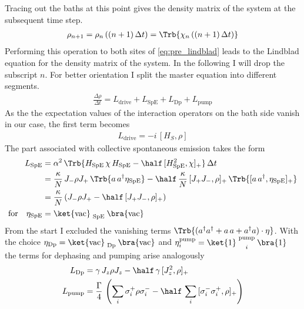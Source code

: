 Tracing out the baths at this point gives the density matrix of the system at the subsequent time step. 
\begin{align*}
    \rho_{n+1}=\rho_n\left((n+1)\,\Delta t\right)=\Trb{\chi_n\left((n+1)\,\Delta t\right)}
\end{align*}
Performing this operation to both sites of \eqref{eq:pre_lindblad} leads to the Lindblad equation for the density matrix of the system. In the following I will drop the subscript $n$. For better orientation I split the master equation into different segments.
\begin{align*}
    \frac{\Delta\rho}{\Delta t}=L_\text{drive}+L_\text{SpE}+L_\text{Dp}+L_\text{pump}
\end{align*}
As the the expectation values of the interaction operators on the bath side vanish in our case, the first term becomes
\begin{align*}
    L_\text{drive}=-i\,[H_S,\rho]
\end{align*}
The part associated with collective spontaneous emission takes the form
\begin{align*}
    L_\text{SpE} &= \alpha^2\,\Trb{H_\text{SpE}\,\chi \,H_\text{SpE}-\half\,[H_\text{SpE}^2,\chi]_+}\,\Delta t\\
    &= \frac{\kappa}{N}\,J_-\rho J_+\,\Trb{a\,a^\dagger\eta_\text{SpE}}-\half\,\frac{\kappa}{N}\,[J_+J_-,\rho]_+\,\Trb{[a\,a^\dagger,\eta_\text{SpE}]_+}\\
    &=\frac{\kappa}{N}\,(J_-\rho J_+-\half\,[J_+J_-,\rho]_+)\\
    \text{for}\quad\eta_\text{SpE}&=\ket{\text{vac}}\mathrel{\substack{\,\\\,\\ \text{SpE}}}\bra{\text{vac}}
\end{align*}
From the start I excluded the vanishing terms $\Trb{(a^\dagger a^\dagger+a\,a+a^\dagger a)\cdot\eta}$. With the choice $\eta_\text{Dp}=\ket{\text{vac}}\mathrel{\substack{\,\\\,\\ \text{Dp}}}\bra{\text{vac}}$ and $\eta^\text{pump}_i=\ket{1}\mathrel{\substack{\text{pump}\\\,\\ i}}\bra{1}$ the terms for dephasing and pumping arise analogously
\begin{align*}
    L_\text{Dp}%
    &=\gamma\,J_z\rho J_z-\half\,\gamma\,[J_z^2,\rho]_+\\
    L_\text{pump}%
    &=\frac{\Gamma}{4}\,\left(\sum_i\sigma_i^+\rho \sigma_i^--\half\,\sum_i\,[\sigma_i^-\sigma_i^+,\rho]_+\right)\\
\end{align*}
